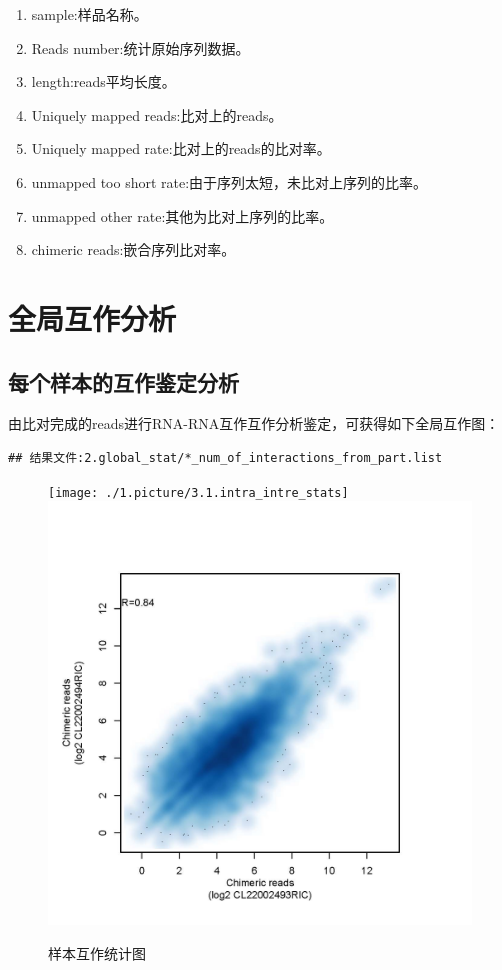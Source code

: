 \documentclass[
]{ctexart}
\providecommand{\tightlist}{%
  \setlength{\itemsep}{0pt}\setlength{\parskip}{0pt}}
\begin{document}
\begin{enumerate}
\def\labelenumi{(\arabic{enumi})}
\tightlist
\item
  sample:样品名称。
\item
  Reads number:统计原始序列数据。
\item
  length:reads平均长度。
\item
  Uniquely mapped reads:比对上的reads。
\item
  Uniquely mapped rate:比对上的reads的比对率。
\item
  unmapped too short rate:由于序列太短，未比对上序列的比率。
\item
  unmapped other rate:其他为比对上序列的比率。
\item
  chimeric reads:嵌合序列比对率。
\end{enumerate}

\hypertarget{ux5168ux5c40ux4e92ux4f5cux5206ux6790}{%
\section{全局互作分析}\label{ux5168ux5c40ux4e92ux4f5cux5206ux6790}}

\hypertarget{ux6bcfux4e2aux6837ux672cux7684ux4e92ux4f5cux9274ux5b9aux5206ux6790}{%
\subsection{每个样本的互作鉴定分析}\label{ux6bcfux4e2aux6837ux672cux7684ux4e92ux4f5cux9274ux5b9aux5206ux6790}}

由比对完成的reads进行RNA-RNA互作互作分析鉴定，可获得如下全局互作图：

\begin{verbatim}
## 结果文件:2.global_stat/*_num_of_interactions_from_part.list
\end{verbatim}

\begin{figure}[H]

{\centering \texttt{[image: ./1.picture/3.1.intra\_intre\_stats]} \includegraphics[width=0.48\linewidth]{./1.picture/3.2.correlation analysis} 

}

\caption{样本互作统计图}\label{fig:name1}
\end{figure}
\end{document}
